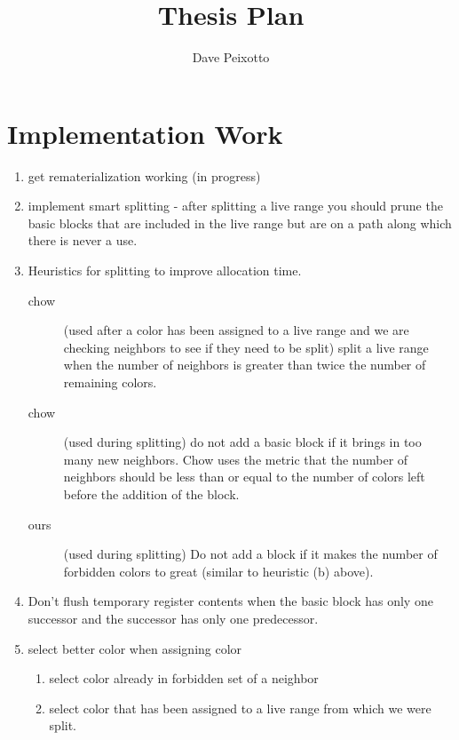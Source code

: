 \documentclass[11pt]{article}
\title{Thesis Plan}
\author{Dave Peixotto}
\begin{document}
\maketitle


\section{Implementation Work}
\begin{enumerate}
\item get rematerialization working (in progress)

\item implement smart splitting - after splitting a live range you
should prune the basic blocks that are included in the live range but
are on a path along which there is never a use.

\item Heuristics for splitting to improve allocation time.\\
  \begin{description}
  \item[chow] (used after a color has been assigned to a live range and we
  are checking neighbors to see if they need to be split) 
  split a live range when the number of neighbors is greater than
  twice the number of remaining colors.
  \item[chow] (used during splitting) do not add a basic block if it brings
  in too many new neighbors. Chow uses the metric that the number of
  neighbors should be less than or equal to the number of colors left
  before the addition of the block.

  \item[ours] (used during splitting) Do not add a block if it makes the
  number of forbidden colors to great (similar to heuristic (b)
  above).
  \end{description}



\item Don't flush temporary register contents when the basic block has
only one successor and the successor has only one predecessor.

\item select better color when assigning color
  \begin{enumerate}
  \item select color already in forbidden set of a neighbor
  \item select color that has been assigned to a live range from which
  we were split.
  \end{enumerate}


\end{enumerate}
\end{document}
